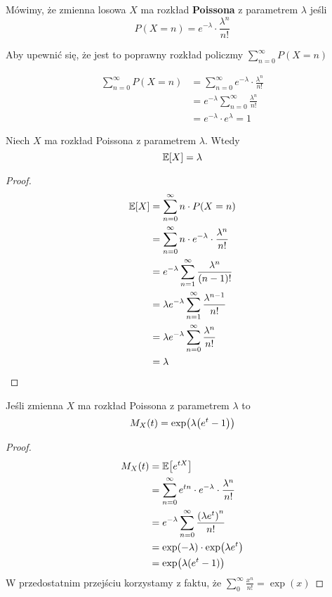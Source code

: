 \begin{definition}
	Mówimy, że zmienna losowa \( X \) ma rozkład
	\textbf{Poissona} z parametrem \( \lambda \) jeśli
	\[
		P(X = n) = e^{-\lambda} \cdot \frac{\lambda^n}{n!}
	\]
\end{definition}

Aby upewnić się, że jest to poprawny rozkład policzmy \( \sum_{n = 0}^\infty P(X = n) \)

\begin{align*}
	\sum_{n = 0}^\infty P(X = n)
	 & = \sum_{n = 0}^\infty e^{-\lambda} \cdot \frac{\lambda^n}{n!} \\
	 & = e^{-\lambda} \sum_{n=0}^\infty \frac{\lambda^n}{n!}         \\
	 & = e^{-\lambda} \cdot  e^\lambda = 1
\end{align*}

\begin{theorem}
	Niech \( X \) ma rozkład Poissona z parametrem \( \lambda \). Wtedy
	\[
		\expected{X} = \lambda
	\]
\end{theorem}
\begin{proof}
	\begin{align*}
		\expected{X} & = \sum_{n = 0}^\infty n \cdot P(X = n)                                \\
		             & = \sum_{n = 0}^\infty n \cdot e^{-\lambda} \cdot \frac{\lambda^n}{n!} \\
		             & = e^{-\lambda} \sum_{n=1}^\infty \frac{\lambda^n}{(n-1)!}             \\
		             & = \lambda e^{-\lambda} \sum_{n=1}^\infty \frac{\lambda^{n-1}}{n!}     \\
		             & = \lambda e^{-\lambda} \sum_{n=0}^\infty \frac{\lambda^n}{n!}         \\
		             & = \lambda
	\end{align*}
\end{proof}

\begin{theorem}[Lemat 5.3 P\&C]
	Jeśli zmienna \( X \) ma rozkład Poissona z parametrem \( \lambda \) to
	\[
		M_X(t) = \exp\pars{\lambda\pars{e^t -  1}}
	\]
\end{theorem}
\begin{proof}
	\begin{align*}
		M_X(t)
		 & = \expected{e^{tX}}                                                      \\
		 & = \sum_{n=0}^\infty e^{tn} \cdot e^{-\lambda} \cdot \frac{\lambda^n}{n!} \\
		 & = e^{-\lambda} \sum_{n=0}^\infty \frac{\pars{\lambda e^t}^n}{n!}         \\
		 & = \exp(-\lambda) \cdot \exp\pars{\lambda e^t}                            \\
		 & = \exp\pars{\lambda(e^t - 1)}
	\end{align*}
	W przedostatnim przejściu korzystamy z faktu, że \( \sum_{0}^\infty \frac{x^n}{n!} = \exp(x) \)
\end{proof}

